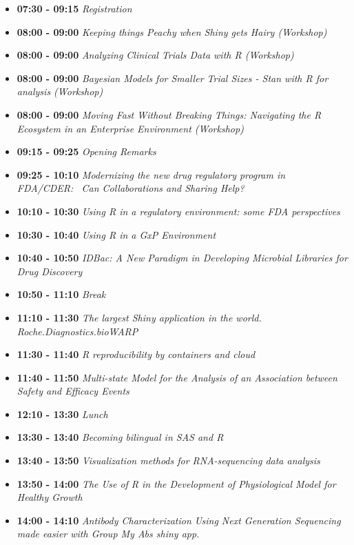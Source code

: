 \documentclass[]{book}
\providecommand{\tightlist}{%
  \setlength{\itemsep}{0pt}\setlength{\parskip}{0pt}}
\theoremstyle{definition}
\theoremstyle{definition}
\theoremstyle{definition}
\theoremstyle{remark}
\begin{document}
\begin{itemize}
\tightlist
\item
  \textbf{07:30 - 09:15} \emph{Registration}
\item
  \textbf{08:00 - 09:00} \emph{Keeping things Peachy when Shiny gets
  Hairy (Workshop)}
\item
  \textbf{08:00 - 09:00} \emph{Analyzing Clinical Trials Data with R
  (Workshop)}
\item
  \textbf{08:00 - 09:00} \emph{Bayesian Models for Smaller Trial Sizes -
  Stan with R for analysis (Workshop)}
\item
  \textbf{08:00 - 09:00} \emph{Moving Fast Without Breaking Things:
  Navigating the R Ecosystem in an Enterprise Environment (Workshop)}
\item
  \textbf{09:15 - 09:25} \emph{Opening Remarks}
\item
  \textbf{09:25 - 10:10} \emph{Modernizing the new drug regulatory
  program in FDA/CDER:~ Can Collaborations and Sharing Help?}
\item
  \textbf{10:10 - 10:30} \emph{Using R in a regulatory environment: some
  FDA perspectives}
\item
  \textbf{10:30 - 10:40} \emph{Using R in a GxP Environment}
\item
  \textbf{10:40 - 10:50} \emph{IDBac: A New Paradigm in Developing
  Microbial Libraries for Drug Discovery}
\item
  \textbf{10:50 - 11:10} \emph{Break}
\item
  \textbf{11:10 - 11:30} \emph{The largest Shiny application in the
  world. Roche.Diagnostics.bioWARP}
\item
  \textbf{11:30 - 11:40} \emph{R reproducibility by containers and
  cloud}
\item
  \textbf{11:40 - 11:50} \emph{Multi-state Model for the Analysis of an
  Association between Safety and Efficacy Events}
\item
  \textbf{12:10 - 13:30} \emph{Lunch}
\item
  \textbf{13:30 - 13:40} \emph{Becoming bilingual in SAS and R}
\item
  \textbf{13:40 - 13:50} \emph{Visualization methods for RNA-sequencing
  data analysis}
\item
  \textbf{13:50 - 14:00} \emph{The Use of R in the Development of
  Physiological Model for Healthy Growth}
\item
  \textbf{14:00 - 14:10} \emph{Antibody Characterization Using Next
  Generation Sequencing made easier with Group My Abs shiny app.}

\end{itemize}
\end{document}
